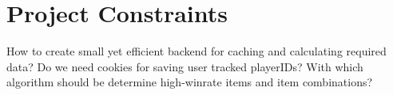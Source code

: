 \section{Project Constraints}
How to create small yet efficient backend for caching and calculating required data?
Do we need cookies for saving user tracked playerIDs?
With which algorithm should be determine high-winrate items and item combinations?